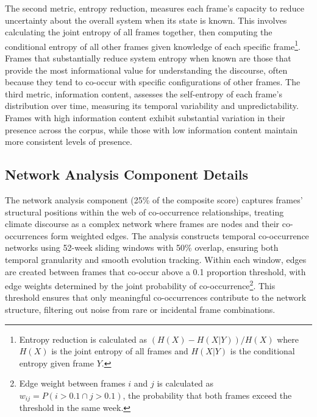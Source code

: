 \documentclass[12pt]{article}
\begin{document}
The second metric, entropy reduction, measures each frame's capacity to reduce uncertainty about the overall system when its state is known. This involves calculating the joint entropy of all frames together, then computing the conditional entropy of all other frames given knowledge of each specific frame\footnote{Entropy reduction is calculated as $(H(X) - H(X|Y))/H(X)$ where $H(X)$ is the joint entropy of all frames and $H(X|Y)$ is the conditional entropy given frame $Y$.}. Frames that substantially reduce system entropy when known are those that provide the most informational value for understanding the discourse, often because they tend to co-occur with specific configurations of other frames. The third metric, information content, assesses the self-entropy of each frame's distribution over time, measuring its temporal variability and unpredictability. Frames with high information content exhibit substantial variation in their presence across the corpus, while those with low information content maintain more consistent levels of presence.

\subsection{Network Analysis Component Details}

The network analysis component (25\% of the composite score) captures frames' structural positions within the web of co-occurrence relationships, treating climate discourse as a complex network where frames are nodes and their co-occurrences form weighted edges. The analysis constructs temporal co-occurrence networks using 52-week sliding windows with 50\% overlap, ensuring both temporal granularity and smooth evolution tracking. Within each window, edges are created between frames that co-occur above a 0.1 proportion threshold, with edge weights determined by the joint probability of co-occurrence\footnote{Edge weight between frames $i$ and $j$ is calculated as $w_{ij} = P(i > 0.1 \cap j > 0.1)$, the probability that both frames exceed the threshold in the same week.}. This threshold ensures that only meaningful co-occurrences contribute to the network structure, filtering out noise from rare or incidental frame combinations.
\end{document}
